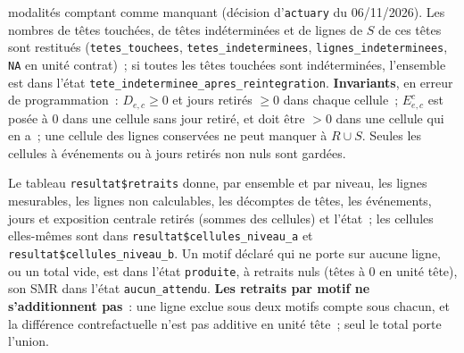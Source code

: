 \documentclass[a4paper,11pt]{article}
\newcommand{\code}[1]{\texttt{\small #1}}
\begin{document}
{modalités comptant comme manquant (décision d'\code{actuary} du 06/11/2026).
Les nombres de têtes touchées, de têtes indéterminées et de lignes de $S$ de
ces têtes sont restitués (\code{tetes\_touchees},
\code{tetes\_indeterminees}, \code{lignes\_indeterminees}, \code{NA} en
unité contrat)~; si toutes les têtes touchées sont indéterminées, l'ensemble
est dans l'état \code{tete\_indeterminee\_apres\_reintegration}.
\textbf{Invariants}, en erreur de programmation~: $D_{e,c} \ge 0$ et jours
retirés $\ge 0$ dans chaque cellule~; $E^c_{e,c}$ est posée à $0$ dans une
cellule sans jour retiré, et doit être $> 0$ dans une cellule qui en a~;
une cellule des lignes conservées ne peut manquer à $R \cup S$. Seules les
cellules à événements ou à jours retirés non nuls sont gardées.

\noindent
Le tableau \code{resultat\$retraits} donne, par ensemble et par niveau, les
lignes mesurables, les lignes non calculables, les décomptes de têtes, les
événements, jours et exposition centrale retirés (sommes des cellules) et
l'état~; les cellules elles-mêmes sont dans
\code{resultat\$cellules\_niveau\_a} et \code{resultat\$cellules\_niveau\_b}.
Un motif déclaré qui ne porte sur aucune ligne, ou un total vide, est dans
l'état \code{produite}, à retraits nuls (têtes à 0 en unité tête), son
SMR dans l'état \code{aucun\_attendu}. \textbf{Les
retraits par motif ne s'additionnent pas}~: une ligne exclue sous deux motifs
compte sous chacun, et la différence contrefactuelle n'est pas additive en
unité tête~; seul le total porte l'union.

}
\end{document}
